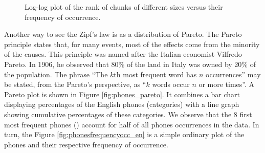 \begin{figure}[h!]
\noindent{}
\caption{Log-log plot of the rank of chunks of different sizes versus their frequency of occurrence.}
\label{fig:simulate_chunks}
\end{figure}

Another way to see the Zipf's law is as a distribution of Pareto. The Pareto principle states that, for many events, most of the effects come from the minority of the causes.  This principle was named after the Italian economist Vilfredo Pareto. In 1906, he observed that 80\% of the land in Italy was owned by 20\% of the population. The phrase ``The $k$th most frequent word has $n$ occurrences'' may be stated, from the Pareto's perspective, as ``$k$ words occur $n$ or more times''. A Pareto plot is shown in Figure \ref{fig:phones_pareto}. It combines a bar chart displaying percentages of the English phones (categories) with a line graph showing cumulative percentages of these categories. We observe that the 8 first most frequent phones (\textipa{[@, t, n, s, I, r, d, l]}) account for half of all phones occurrences in the data. 
In turn, the Figure \ref{fig:phonesfrequencyocc_en} is a simple ordinary plot of the phones and their respective frequency of occurrence. 


